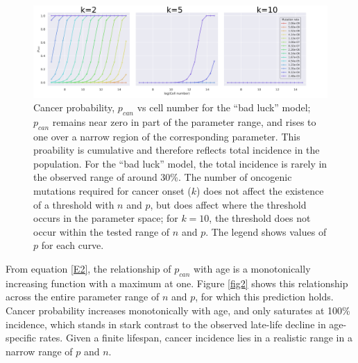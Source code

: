 \documentclass[10pt,twocolumn,twoside]{article}
\begin{document}
\begin{figure}[tbhp]
	\centering
	\includegraphics[width=\linewidth]{fig1.png}
	\caption{Cancer probability, $p_{can}$ vs cell number for the ``bad luck'' model; $p_{can}$ remains near zero in part of the parameter range, and rises to one over a narrow region of the corresponding parameter. This proability is cumulative and therefore reflects total incidence in the population. For the ``bad luck'' model, the total incidence is rarely in the observed range of around 30\%. The number of oncogenic mutations required for cancer onset ($k$) does not affect the existence of a threshold with $n$ and $p$, but does affect where the threshold occurs in the parameter space; for $k=10$, the threshold does not occur within the tested range of $n$ and $p$. The legend shows values of $p$ for each curve.}
	\label{fig1}
\end{figure}

From equation \ref{E2}, the relationship of $p_{can}$ with age is a monotonically increasing function with a maximum at one. Figure \ref{fig2} shows this relationship across the entire parameter range of $n$ and $p$, for which this prediction holds. Cancer probability increases monotonically with age, and only saturates at 100\% incidence, which stands in stark contrast to the observed late-life decline in age-specific rates. Given a finite lifespan, cancer incidence lies in a realistic range in a narrow range of $p$ and $n$.
\end{document}
